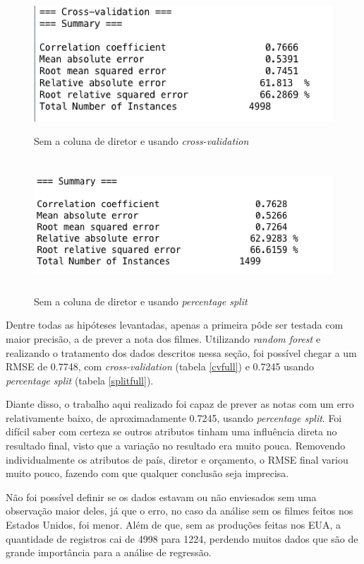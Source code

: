 \begin{figure}[H]
\centering
\includegraphics[height=5cm]{imagens/no_director_cv.png}
\caption{Sem a coluna de diretor e usando \textit{cross-validation}}
\label{nodirectorcv}
\end{figure}

\begin{figure}[H]
\centering
\includegraphics[height=5cm]{imagens/no_director_split.png}
\caption{Sem a coluna de diretor e usando \textit{percentage split}}
\label{nodirectorsplit}
\end{figure}

Dentre todas as hipóteses levantadas, apenas a primeira pôde ser testada com maior precisão, a de prever a nota dos filmes. Utilizando \textit{random forest} e realizando o tratamento dos dados descritos nessa seção, foi possível chegar a um RMSE de 0.7748, com \textit{cross-validation} (tabela \ref{cvfull}) e 0.7245 usando \textit{percentage split} (tabela \ref{splitfull}). 

Diante disso, o trabalho aqui realizado foi capaz de prever as notas com um erro relativamente baixo, de aproximadamente 0.7245, usando \textit{percentage split}. Foi difícil saber com certeza se outros atributos tinham uma influência direta no resultado final, visto que a variação no resultado era muito pouca. Removendo individualmente os atributos de país, diretor e orçamento, o RMSE final variou muito pouco, fazendo com que qualquer conclusão seja imprecisa.

Não foi possível definir se os dados estavam ou não enviesados sem uma observação maior deles, já que o erro, no caso da análise sem os filmes feitos nos Estados Unidos, foi menor. Além de que, sem as produções feitas nos EUA, a quantidade de registros cai de 4998 para 1224, perdendo muitos dados que são de grande importância para a análise de regressão.

